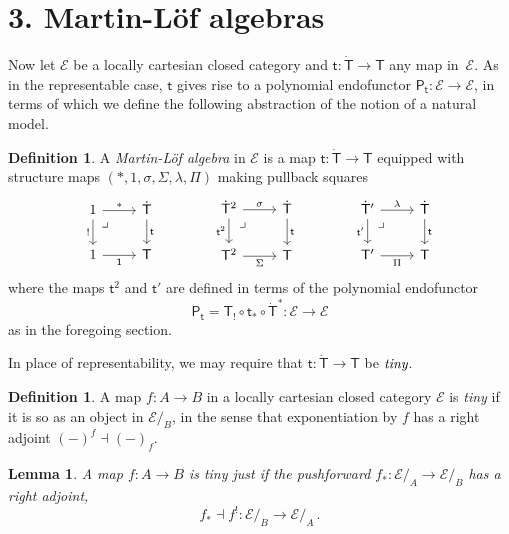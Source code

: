\documentclass[12pt,reqno]{amsart}
\newcommand{\EE}{\ensuremath{\mathcal{E}}}
\newcommand{\alg}[1]{\ensuremath{\mathsf{#1}}}
\renewcommand{\to}{\ensuremath{\rightarrow}}
\newcommand{\too}{\ensuremath{\longrightarrow}}
\renewcommand{\t}{\ensuremath{\mathsf{t}}}
\newcommand{\tT}{\ensuremath{{\t}:\TT\to\T}}
\newcommand{\T}{\ensuremath{\mathsf{T}}}
\newcommand{\TT}{\ensuremath{\dot{\mathsf{T}}}}
\newcommand{\pbcorner}{\arrow[dr,phantom,"\lrcorner" very near start, shift right=.5ex]} %
\newtheorem{lemma}[theorem]{Lemma}
\theoremstyle{remark}
\theoremstyle{definition}
\newtheorem{definition}[theorem]{Definition}
\begin{document}
\section*{3. Martin-L\"of algebras}\label{sec:MLalgebras}

Now let $\EE$ be a locally cartesian closed category and $\tT$ any map in~$\EE$. As in the representable case, $\t$ gives rise to a polynomial endofunctor $\alg{P}_\t : \EE\to\EE$, in terms of which we define the following abstraction of the notion of a  natural model.

\begin{definition}\label{def:MLalg}
A \emph{Martin-L\"of algebra} in $\EE$ is a map $\tT$ equipped with structure maps $(*, 1, \sigma, \Sigma, \lambda, \Pi)$ making pullback squares 
\begin{equation}\label{diag:MLalg}
\begin{tikzcd}
	1 \ar[r,"*"] \ar[d,swap,"!"] \pbcorner &  \TT \ar[d, "\t"]\\  
	1 \ar[r, swap,"\mathsf{1}"] & \T
 \end{tikzcd}\qquad \qquad 
 \begin{tikzcd}
	\TT^2  \ar[r,"\sigma"] \ar[d,swap,"\t^2"] \pbcorner &  \TT \ar[d, "\t"]\\  
	\T^2 \ar[r,swap, "\Sigma"] & \T
	 \end{tikzcd} \qquad \qquad 
	 \begin{tikzcd}
	\TT'  \ar[r,"\lambda"] \ar[d,swap,"\t' "] \pbcorner &  \TT \ar[d, "\t"]\\  
	\T' \ar[r,swap, "\Pi"] & \T
 \end{tikzcd} 
 \end{equation}
 where the maps $\t^2$ and $\t'$ are defined in terms of the polynomial endofunctor $$\alg{P}_\t = \T_! \circ \t_* \circ \TT^* : \EE\too\EE$$ as in the foregoing section.
\end{definition}

In place of representability, we may require that $\tT$ be $\emph{tiny}$.

\begin{definition}
 A map $f : A \to B$ in a locally cartesian closed category $\EE$ is \emph{tiny} if it is so as an object in $\EE/_B$, in the sense that  exponentiation by $f$  has a right adjoint $(-)^f \dashv (-)_f$. 
\end{definition}

\begin{lemma}
A map $f : A \to B$ is tiny just if the \emph{pushforward} $f_* : \EE/_A \to \EE/_B$ has a right adjoint,
\[
f_* \dashv f^! : \EE/_B \too \EE/_A\,.
\]
\end{lemma}
\end{document}
